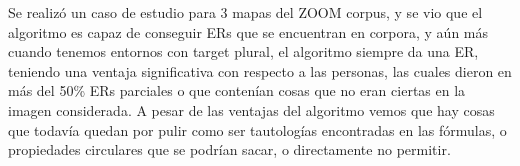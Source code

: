 Se realiz\'o un caso de estudio para 3 mapas del ZOOM corpus, y se vio que el algoritmo es capaz de conseguir ERs que se encuentran en corpora, y a\'un m\'as cuando tenemos entornos con target plural, el algoritmo siempre da una ER, teniendo una ventaja significativa con respecto a las personas, las cuales dieron en m\'as del 50\% ERs parciales o que conten\'ian cosas que no eran ciertas en la imagen considerada. A pesar de las ventajas del algoritmo vemos que hay cosas que todav\'ia quedan por pulir como ser tautolog\'ias encontradas en las f\'ormulas, o propiedades circulares que se podr\'ian sacar, o directamente no permitir.

 

